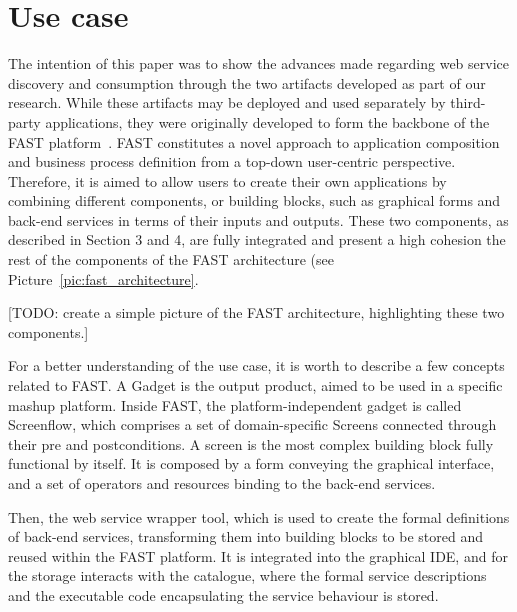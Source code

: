 
\section{Use case}
\label{sec:use_case}

The intention of this paper was to show the advances made regarding web service discovery and consumption through the two artifacts developed as part of our research. While these artifacts may be deployed and used separately by third-party applications, they were originally developed to form the backbone of the FAST platform~\cite{hoyer2009fast}.
FAST constitutes a novel approach to application composition and business process definition from a top-down user-centric perspective. Therefore, it is aimed to allow users to create their own applications by combining different components, or building blocks, such as graphical forms and back-end services in terms of their inputs and outputs. These two components, as described in Section 3 and 4, are fully integrated and present a high cohesion the rest of the components of the FAST architecture (see Picture~\ref{pic:fast_architecture}. 

[TODO: create a simple picture of the FAST architecture, highlighting these two components.]

For a better understanding of the use case, it is worth to describe a few concepts related to FAST. A Gadget is the output product, aimed to be used in a specific mashup platform. Inside FAST, the platform-independent gadget is called Screenflow, which comprises a set of domain-specific Screens connected through their pre and postconditions. A screen is the most complex building block fully functional by itself. It is composed by a form conveying the graphical interface, and a set of operators and resources binding to the back-end services.

Then, the web service wrapper tool, which is used to create the formal definitions of back-end services, transforming them into building blocks to be stored and reused within the FAST platform. It is integrated into the graphical IDE, and for the storage interacts with the catalogue, where the formal service descriptions and the executable code encapsulating the service behaviour is stored.

